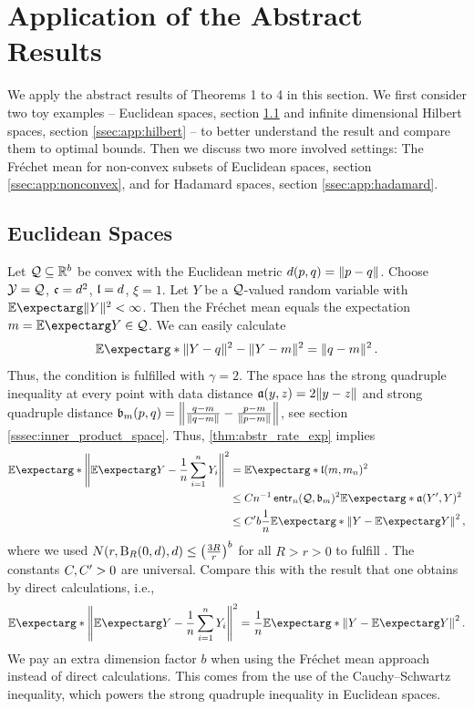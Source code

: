 \section{Application of the Abstract Results}\label{sec:applications}
%
We apply the abstract results of Theorems 1 to 4 in this section. We first consider two toy examples -- Euclidean spaces, section \ref{ssec:app:euclid} and infinite dimensional Hilbert spaces, section \ref{ssec:app:hilbert} --  to better understand the result and compare them to optimal bounds. Then we discuss two more involved settings: The Fréchet mean for non-convex subsets of Euclidean spaces, section \ref{ssec:app:nonconvex}, and for Hadamard spaces, section \ref{ssec:app:hadamard}.
%
%
\subsection{Euclidean Spaces}\label{ssec:app:euclid}
%
	Let $\mathcal{Q} \subseteq \mathbb{R}^b$ be convex with the Euclidean metric $d(p,q) = \Vert p-q \Vert$.
	Choose $\mathcal{Y} = \mathcal{Q}$, $\mathfrak{c} =  d^2$, $\mathfrak{l} = d$, $\xi=1$.
	Let $Y$ be a $\mathcal{Q}$-valued random variable with $\Ex{\normof{Y}^2}<\infty$.
	Then the Fréchet mean equals the expectation $m =\Ex{Y} \in \mc Q$. We can easily calculate
	\begin{equation*}
		\Ex*{\normof{Y-q}^2-\normof{Y-m}^2} = \normof{q-m}^2\eqfs
	\end{equation*}
	Thus, the  condition is fulfilled with $\gamma=2$.
	The space has the strong quadruple inequality at every point with data distance $\mathfrak{a}(y,z) = 2 \Vert y-z \Vert$ and strong quadruple distance $\mathfrak{b}_m(p,q) = \left\Vert \frac{q-m}{\Vert q-m \Vert}-\frac{p-m}{\Vert p-m \Vert} \right\Vert$, see section \ref{sssec:inner_product_space}. Thus, \autoref{thm:abstr_rate_exp} implies
	\begin{align*}
		\Ex*{\normOf{\Ex{Y}-\frac1n\sum_{i=1}^nY_i}^2} 
		&=
		\Ex*{\mf l(m,m_n)^2} 
		\\&\leq 
		C
		n^{-1} 
		\entrn(\mc Q, \mf b_m)^2
		\Ex*{\mf a(Y\pr, Y)^2}
		\\&\leq
		C\pr b \frac1n \Ex*{\normOf{Y-\Ex{Y}}^2}
		\eqcm
	\end{align*}
	where we used $N(r,\operatorname{\mathrm{B}}_{R}(0,d),d) \leq \left( \frac{3 R}{r} \right)^b$ for all $R>r>0$ \cite[section 4]{pollard90} to fulfill . The constants $C, C^\prime > 0$ are universal.
	Compare this with the result that one obtains by direct calculations, i.e.,
	\begin{equation*}
		\Ex*{\normOf{\Ex{Y}-\frac1n\sum_{i=1}^nY_i}^2}  = \frac1n\Ex*{\normOf{Y-\Ex{Y}}^2}
		\eqfs
	\end{equation*}
	We pay an extra dimension factor $b$ when using the Fréchet mean approach instead of direct calculations. This comes from the use of the Cauchy--Schwartz inequality, which powers the strong quadruple inequality in Euclidean spaces.
%
%
